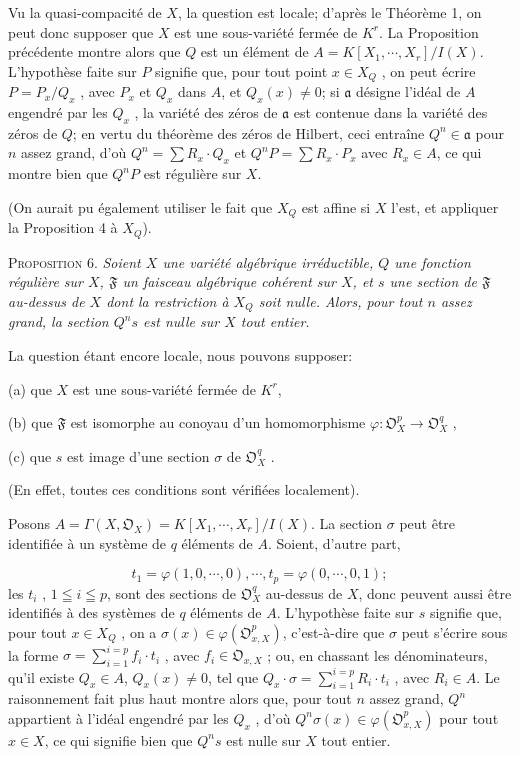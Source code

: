Vu la quasi-compacité de $X$, la question est locale; d'après le Théorème 1, on peut donc supposer que $X$ est une sous-variété fermée de $K^r$. La Proposition précédente montre alors que $Q$ est un élément de $A = K[X_1 , \cdots , X_r]/I(X)$. L'hypothèse faite sur $P$ signifie que, pour tout point $x \in X_Q$ , on peut écrire $P = P_x/Q_x$ , avec $P_x$ et $Q_x$ dans $A$, et $Q_x(x) \neq 0$; si $\mathfrak{a}$ désigne l'idéal de $A$ engendré par les $Q_x$ , la variété des zéros de $\mathfrak{a}$ est contenue dans la variété des zéros de $Q$; en vertu du théorème des zéros de Hilbert, ceci entraîne $Q^n \in \mathfrak{a}$ pour $n$ assez grand, d'où $Q^n = \sum R_x \cdot Q_x$ et $Q^nP = \sum R_x \cdot P_x$ avec $R_x \in A$, ce qui montre bien que $Q^nP$ est régulière sur $X$.

(On aurait pu également utiliser le fait que $X_Q$ est affine si $X$ l'est, et appliquer la Proposition 4 à $X_Q$).

\textsc{Proposition} 6. \textit{Soient $X$ une variété algébrique irréductible, $Q$ une fonction régulière sur $X$, $\mathfrak{F}$ un faisceau algébrique cohérent sur $X$, et $s$ une section de $\mathfrak{F}$ au-dessus de $X$ dont la restriction à $X_Q$ soit nulle. Alors, pour tout $n$ assez grand, la section $Q^ns$ est nulle sur $X$ tout entier.}

La question étant encore locale, nous pouvons supposer:

(a) que $X$ est une sous-variété fermée de $K^r$,

(b) que $\mathfrak{F}$ est isomorphe au conoyau d'un homomorphisme $\varphi : \mathfrak{O}^p_X \to \mathfrak{O}^q_X$ ,

(c) que $s$ est image d'une section $\sigma$ de $\mathfrak{O}^q_X$ .

(En effet, toutes ces conditions sont vérifiées localement).

Posons $A = \Gamma(X , \mathfrak{O}_X) = K[X_1 , \cdots , X_r]/I(X)$. La section $\sigma$ peut être identifiée à un système de $q$ éléments de $A$. Soient, d'autre part,

\begin{equation*}
t_1 = \varphi(1, 0, \cdots , 0), \cdots , t_p = \varphi(0, \cdots , 0, 1);
\end{equation*}
les $t_i$ , $1 \leqq i \leqq p$, sont des sections de $\mathfrak{O}^q_X$ au-dessus de $X$, donc peuvent aussi être identifiés à des systèmes de $q$ éléments de $A$. L'hypothèse faite sur $s$ signifie
que, pour tout $x \in X_Q$ , on a $\sigma(x) \in \varphi(\mathfrak{O}^p_{x,X})$, c'est-à-dire que $\sigma$ peut s'écrire sous la forme $\sigma = \sum_{i=1}^{i=p} f_i \cdot t_i$ , avec $f_i \in \mathfrak{O}_{x,X}$ ; ou, en chassant les dénominateurs, qu'il existe $Q_x \in A$, $Q_x(x) \neq 0$, tel que $Q_x \cdot \sigma = \sum_{i=1}^{i=p} R_i \cdot t_i$ , avec $R_i \in A$. Le raisonnement fait plus haut montre alors que, pour tout $n$ assez grand, $Q^n$ appartient à l'idéal engendré par les $Q_x$ , d'où $Q^n\sigma(x) \in \varphi(\mathfrak{O}^p_{x,X})$ pour tout $x \in X$, ce qui signifie bien que $Q^ns$ est nulle sur $X$ tout entier.


